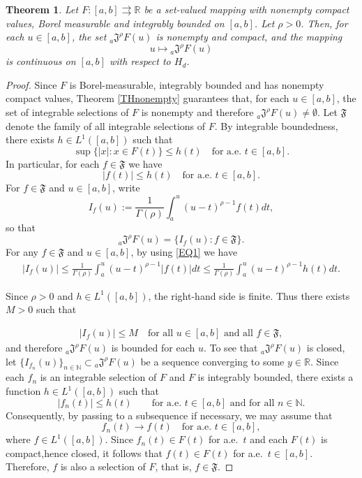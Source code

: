 \documentclass[a4paper,12pt,reqno]{amsart}
\numberwithin{equation}{section}
\newtheorem{theorem}{Theorem}[section]
\theoremstyle{definition}
\theoremstyle{remark}
\numberwithin{equation}{section}
\begin{document}
\begin{theorem}\label{conti}
   Let $F:[a,b]\rightrightarrows\mathbb{R}$ be a set-valued mapping with nonempty compact values, Borel measurable and integrably bounded on $[a,b]$.
Let $\rho>0$. Then, for each $u\in[a,b]$, the set ${}_{a}\mathfrak{J}^{\rho}F(u)$ is nonempty and compact,  and the mapping
$$u \longmapsto {}_{a}\mathfrak{J}^{\rho}F(u)$$
 is continuous on $[a,b]$ with respect to $H_d$.
\end{theorem}
\begin{proof}
Since $F$ is Borel-measurable, integrably bounded and has nonempty compact values, Theorem \ref{THnonempty} guarantees that, for each $u\in[a,b]$, the set of
integrable selections of $F$ is nonempty and therefore
${}_{a}\mathfrak{J}^{\rho}F(u)\neq\emptyset$.
Let $\mathfrak{F}$ denote the family of all integrable selections of $F$. By integrable boundedness, there exists $h\in L^{1}([a,b])$ such that
$$\sup\{|x|:x\in F(t)\}\le h(t)
\quad\text{for a.e. }t\in[a,b].$$
In particular, for each $f\in\mathfrak{F}$ we have
\begin{equation}\label{EQ1}
|f(t)|\le h(t)\quad\text{for a.e. }t\in[a,b].
\end{equation}
For $f\in\mathfrak{F}$ and $u\in[a,b]$, write
$$I_f(u):=\frac{1}{\Gamma(\rho)}\int_{a}^{u}(u-t)^{\rho-1}f(t)dt,$$
so that
$${}_{a}\mathfrak{J}^{\rho}F(u)=\{I_f(u):f\in\mathfrak{F}\}.$$
For any $f\in\mathfrak{F}$ and $u\in[a,b]$, by using \eqref{EQ1} we have
\begin{align*}
    |I_f(u)|
\le
\frac{1}{\Gamma(\rho)}\int_{a}^{u}(u-t)^{\rho-1}|f(t)|dt
\le
\frac{1}{\Gamma(\rho)}\int_{a}^{u}(u-t)^{\rho-1}h(t)dt.
\end{align*}

Since $\rho>0$ and
$h\in L^{1}([a,b])$, the right-hand side is finite. 
Thus there exists $M>0$ such that

\begin{align*}
    |I_f(u)|\le M
\quad\text{for all }u\in[a,b]\text{ and all }f\in\mathfrak{F},
\end{align*}
and therefore ${}_{a}\mathfrak{J}^{\rho}F(u)$ is bounded for each $u$. To see that ${}_{a}\mathfrak{J}^{\rho}F(u)$ is closed, let  $\{I_{f_n}(u)\}_{n\in\mathbb{N}}\subset {}_{a}\mathfrak{J}^{\rho}F(u)$  be a sequence converging to some $y\in\mathbb{R}$.   Since each $f_n$ is an integrable selection of $F$ and $F$ is integrably
bounded, there exists a function $h\in L^{1}([a,b])$ such that
\begin{equation}\label{EQ2}
|f_n(t)|\le h(t)
\qquad\text{for a.e. }t\in[a,b]\text{ and for all }n\in\mathbb{N}.
\end{equation}
Consequently, by passing to a subsequence if necessary, we may assume that
\[
f_n(t)\longrightarrow f(t)
\quad\text{for a.e. }t\in[a,b],
\]
where $f\in L^{1}([a,b])$. Since $f_n(t)\in F(t)$ for a.e.~$t$ and each
$F(t)$ is compact,hence closed, it follows that $f(t)\in F(t)$ for a.e.~$t\in[a,b]$. Therefore, $f$ is also a selection of $F$, that is,
$f\in\mathfrak{F}$.


\end{proof}
\end{document}
